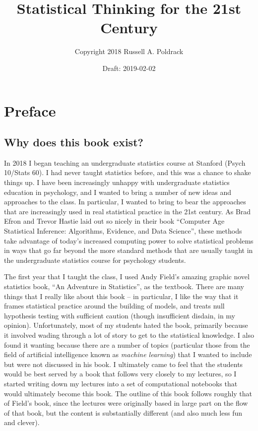 \documentclass[]{book}
\title{Statistical Thinking for the 21st Century}
\author{Copyright 2018 Russell A. Poldrack}
\date{Draft: 2019-02-02}
\theoremstyle{definition}
\theoremstyle{definition}
\theoremstyle{definition}
\theoremstyle{remark}
\begin{document}
\maketitle

{
\setcounter{tocdepth}{1}
\tableofcontents
}
\chapter*{Preface}\label{preface}

\section{Why does this book exist?}\label{why-does-this-book-exist}

In 2018 I began teaching an undergraduate statistics course at Stanford
(Psych 10/Stats 60). I had never taught statistics before, and this was
a chance to shake things up. I have been increasingly unhappy with
undergraduate statistics education in psychology, and I wanted to bring
a number of new ideas and approaches to the class. In particular, I
wanted to bring to bear the approaches that are increasingly used in
real statistical practice in the 21st century. As Brad Efron and Trevor
Hastie laid out so nicely in their book ``Computer Age Statistical
Inference: Algorithms, Evidence, and Data Science'', these methods take
advantage of today's increased computing power to solve statistical
problems in ways that go far beyond the more standard methods that are
usually taught in the undergraduate statistics course for psychology
students.

The first year that I taught the class, I used Andy Field's amazing
graphic novel statistics book, ``An Adventure in Statistics'', as the
textbook. There are many things that I really like about this book -- in
particular, I like the way that it frames statistical practice around
the building of models, and treats null hypothesis testing with
sufficient caution (though insufficient disdain, in my opinion).
Unfortunately, most of my students hated the book, primarily because it
involved wading through a lot of story to get to the statistical
knowledge. I also found it wanting because there are a number of topics
(particular those from the field of artificial intelligence known as
\emph{machine learning}) that I wanted to include but were not discussed
in his book. I ultimately came to feel that the students would be best
served by a book that follows very closely to my lectures, so I started
writing down my lectures into a set of computational notebooks that
would ultimately become this book. The outline of this book follows
roughly that of Field's book, since the lectures were originally based
in large part on the flow of that book, but the content is substantially
different (and also much less fun and clever).
\end{document}
